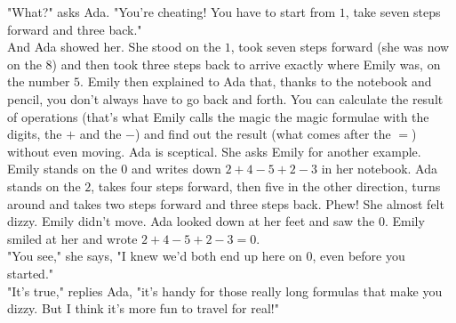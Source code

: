"What?" asks Ada. "You're cheating! You have to start from $1$, take seven steps forward and three back."\\
And Ada showed her. She stood on the $1$, took seven steps forward (she was now on the $8$) and then took three steps back to arrive exactly where Emily was, on the number $5$.
Emily then explained to Ada that, thanks to the notebook and pencil, you don't always have to go back and forth. You can calculate the result of operations (that's what Emily calls the magic the magic formulae with the digits, the $+$ and the $-$) and find out the result (what comes after the $=$) without even moving. Ada is sceptical. She asks Emily for another example. Emily stands on the $0$ and writes down $2 + 4 - 5 + 2 - 3$ in her notebook. Ada stands on the $2$, takes four steps forward, then five in the other direction, turns around and takes two steps forward and three steps back. Phew! She almost felt dizzy. Emily didn't move. Ada looked down at her feet and saw the $0$. Emily smiled at her and wrote $2 + 4 - 5 + 2 - 3 = 0$.\\
"You see," she says, "I knew we'd both end up here on $0$, even before you started." \\
"It's true," replies Ada, "it's handy for those really long formulas that make you dizzy. But I think it's more fun to travel for real!"